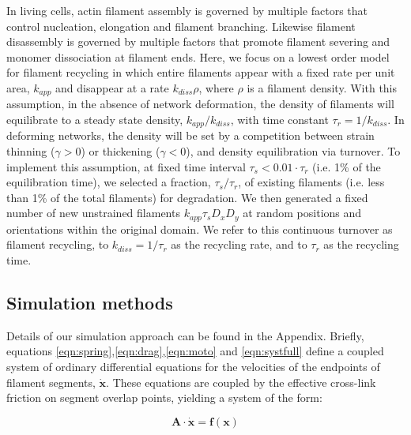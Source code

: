 \documentclass[10pt,letterpaper]{article}
\begin{document}
In living cells, actin filament assembly is governed by multiple factors that control nucleation, elongation and filament branching. Likewise filament disassembly is governed by multiple factors that promote filament severing and monomer dissociation at filament ends. Here, we focus on a lowest order model for filament recycling in which entire filaments appear with a fixed rate per unit area, $k_{app}$ and disappear at a rate $k_{diss}\rho$, where $\rho$ is a filament density. With this assumption, in the absence of network deformation, the density of filaments will equilibrate to a steady state density, $k_{app}/k_{diss}$, with time constant $\tau_r = 1/k_{diss}$.   In deforming networks, the density will be set by a competition between strain thinning ($\gamma>0$) or thickening ($\gamma<0$), and density equilibration via turnover. To implement this assumption, at fixed time interval $\tau_s < 0.01\cdot\tau_r$ (i.e. 1\% of the equilibration time), we selected a fraction, $\tau_s/\tau_r$, of existing filaments (i.e. less than 1\% of the total filaments) for degradation. We then generated a fixed number of new unstrained filaments $k_{app}\tau_sD_xD_y$ at random positions and orientations within the original domain.   We refer to this continuous turnover as filament recycling, to $k_{diss}=1/\tau_r$ as the recycling rate, and to $\tau_r$ as the recycling time.


\subsection*{Simulation methods}

Details of our simulation approach can be found in the Appendix. Briefly, equations \ref{eqn:spring},\ref{eqn:drag},\ref{eqn:moto} and \ref{eqn:systfull} define a coupled system of ordinary differential equations for the velocities of the endpoints of filament segments, $\mathbf{\dot{x}}$.  These equations are coupled by the effective cross-link friction on segment overlap points, yielding a system of the form:

\begin{equation}
\mathbf{A \cdot \dot x} = \mathbf{f(x)}
\end{equation}
\end{document}
